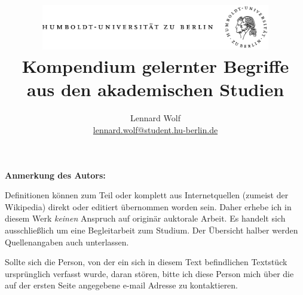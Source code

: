 \documentclass[twoside,twocolumn]{book}
\begin{document}
\title{
	\includegraphics*[width=0.75\textwidth]{images/hu_logo.png}\\
	\vspace{24pt}
	Kompendium gelernter Begriffe\\aus den akademischen Studien}
\author{Lennard Wolf\\
        \href{mailto:lennard.wolf@student.hu-berlin.de}{lennard.wolf@student.hu-berlin.de}}
\maketitle

\textbf{Anmerkung des Autors:} 

Definitionen können zum Teil oder komplett aus Internetquellen (zumeist der Wikipedia) direkt oder editiert übernommen worden sein. Daher erhebe ich in diesem Werk \emph{keinen} Anspruch auf originär auktorale Arbeit. Es handelt sich ausschließlich um eine Begleitarbeit zum Studium. Der Übersicht halber werden Quellenangaben auch unterlassen. 

Sollte sich die Person, von der ein sich in diesem Text befindlichen Textstück ursprünglich verfasst wurde, daran stören, bitte ich diese Person mich über die auf der ersten Seite angegebene e-mail Adresse zu kontaktieren.
\end{document}
